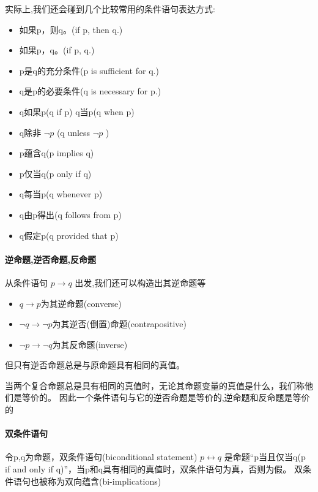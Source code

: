 \documentclass[12pt,a4paper,oneside]{ctexart}
\begin{document}
实际上,我们还会碰到几个比较常用的条件语句表达方式:

\begin{itemize}
\item
  如果p，则q。(if p, then q.)
\item
  如果p，q。(if p, q.)
\item
  p是q的充分条件(p is sufficient for q.)
\item
  q是p的必要条件(q is necessary for p.)
\item
  q如果p(q if p) q当p(q when p)
\item
  q除非 \(\neg p\) (q unless \(\neg p\) )
\item
  p蕴含q(p implies q)
\item
  p仅当q(p only if q)
\item
  q每当p(q whenever p)
\item
  q由p得出(q follows from p)
\item
  q假定p(q provided that p)
\end{itemize}

\paragraph*{逆命题,逆否命题,反命题}

从条件语句 \(p\rightarrow q\) 出发,我们还可以构造出其逆命题等

\begin{itemize}
\item
  \(q\rightarrow p\)为其逆命题(converse)
\item
  \(\neg q\rightarrow \neg p\)为其逆否(倒置)命题(contrapositive)
\item
  \(\neg p\rightarrow \neg q\)为其反命题(inverse)
\end{itemize}

但只有逆否命题总是与原命题具有相同的真值。

当两个复合命题总是具有相同的真值时，无论其命题变量的真值是什么，我们称他们是等价的。 因此一个条件语句与它的逆否命题是等价的,逆命题和反命题是等价的

\paragraph*{双条件语句}

令p,q为命题，双条件语句(biconditional statement) \(p \leftrightarrow q\) 是命题``p当且仅当q(p if and only if q)''，当p和q具有相同的真值时，双条件语句为真，否则为假。 双条件语句也被称为双向蕴含(bi-implications)
\end{document}
